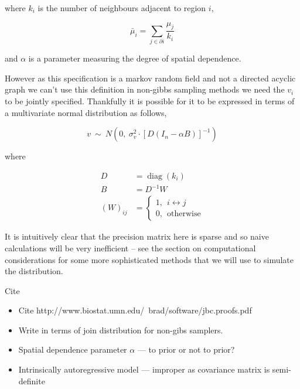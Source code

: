 \documentclass{report}
\begin{document}
where $k_i$ is the number of neighbours adjacent to region $i$,

\begin{equation}
\bar{\mu}_i = \sum_{j \in \partial i} \frac{\mu_j}{k_i}
\end{equation}

and $\alpha$ is a parameter measuring the degree of spatial dependence. 

However as this specification is a markov random field and not a directed acyclic graph we can't use this definition in non-gibbs sampling methods \- we need the $v_i$ to be jointly specified. Thankfully it is possible for it to be expressed in terms of a multivariate normal distribution as follows,

\begin{equation}
v \ \sim \ N(0, \ \sigma_v^2 \cdot {[D(I_n - \alpha B)]}^{-1})
\end{equation}

where

\begin{align}
D &= \operatorname{diag}(k_i) \\
B &= D^{-1} W \\
{(W)}_{ij} &= 
\begin{cases}
1, \ \ i \leftrightarrow j \\
0, \ \ \textrm{otherwise}
\end{cases}
\end{align} 

It is intuitively clear that the precision matrix here is sparse and so naive calculations will be very inefficient -- see the section on computational considerations for some more sophisticated methods that we will use to simulate the distribution.

Cite \cite{car}

\begin{itemize}

\item Cite http://www.biostat.umn.edu/~brad/software/jbc.proofs.pdf

\item Write in terms of join distribution for non-gibs samplers.

\item Spatial dependence parameter $\alpha$ --- to prior or not to prior?

\item Intrinsically autoregressive model --- improper as covariance matrix is semi-definite

\end{itemize}
\end{document}
